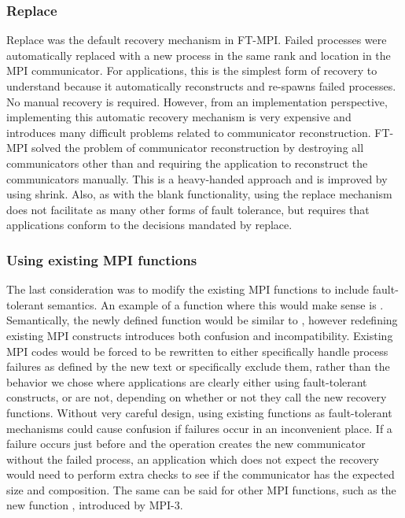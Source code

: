 \subsubsection{Replace}\label{subsubsec:ulfm:rebuild:replace}

Replace was the default recovery mechanism in FT-MPI. Failed processes were
automatically replaced with a new process in the same rank and location in the
MPI communicator. For applications, this is the simplest form of recovery to
understand because it automatically reconstructs  and 
re-spawns failed processes. No manual recovery is required. However, from an
implementation perspective, implementing this automatic recovery mechanism is
very expensive and introduces many difficult problems related to communicator
reconstruction. FT-MPI solved the problem of communicator reconstruction by
destroying all communicators other than  and requiring
the application to reconstruct the communicators manually. This is a
heavy-handed approach and is improved by using shrink. Also, as with the blank
functionality, using the replace mechanism does not facilitate as many other
forms of fault tolerance, but requires that applications conform to the
decisions mandated by replace.

\subsubsection{Using existing MPI functions}
\label{subsubsec:ulfm:rebuild:existing}

The last consideration was to modify the existing MPI functions to include
fault-tolerant semantics. An example of a function where this would make
sense is . Semantically, the newly defined function
would be similar to , however redefining existing MPI
constructs introduces both confusion and incompatibility. Existing MPI codes
would be forced to be rewritten to either specifically handle process failures
as defined by the new text or specifically exclude them, rather than the
behavior we chose where applications are clearly either using fault-tolerant
constructs, or are not, depending on whether or not they call the new recovery 
functions. Without very careful design, using existing functions as
fault-tolerant mechanisms could cause confusion if failures occur in an
inconvenient place. If a failure occurs just before  and
the operation creates the new communicator without the failed process, an
application which does not expect the recovery would need to perform extra
checks to see if the communicator has the expected size and composition. The 
same can be said for other MPI functions, such as the new function
, introduced by MPI-3.


